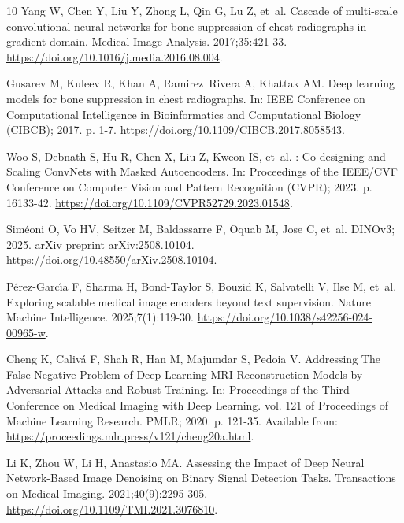 \begin{thebibliography}{10}
Yang W, Chen Y, Liu Y, Zhong L, Qin G, Lu Z, et~al.
\newblock Cascade of multi-scale convolutional neural networks for bone
  suppression of chest radiographs in gradient domain.
\newblock Medical Image Analysis. 2017;35:421-33.
\newblock \url{https://doi.org/10.1016/j.media.2016.08.004}.

Gusarev M, Kuleev R, Khan A, Ramirez~Rivera A, Khattak AM.
\newblock Deep learning models for bone suppression in chest radiographs.
\newblock In: {IEEE} Conference on Computational Intelligence in Bioinformatics
  and Computational Biology ({CIBCB}); 2017. p. 1-7.
\newblock \url{https://doi.org/10.1109/CIBCB.2017.8058543}.

Woo S, Debnath S, Hu R, Chen X, Liu Z, Kweon IS, et~al.
: Co-designing and Scaling {ConvNets} with Masked
  Autoencoders.
\newblock In: Proceedings of the {IEEE/CVF} Conference on Computer Vision and
  Pattern Recognition ({CVPR}); 2023. p. 16133-42.
\newblock \url{https://doi.org/10.1109/CVPR52729.2023.01548}.

Sim{\'e}oni O, Vo HV, Seitzer M, Baldassarre F, Oquab M, Jose C, et~al.
  {DINOv3}; 2025.
\newblock arXiv preprint arXiv:2508.10104.
\newblock \url{https://doi.org/10.48550/arXiv.2508.10104}.

P{\'e}rez-Garc{\'\i}a F, Sharma H, Bond-Taylor S, Bouzid K, Salvatelli V, Ilse
  M, et~al.
\newblock Exploring scalable medical image encoders beyond text supervision.
\newblock Nature Machine Intelligence. 2025;7(1):119-30.
\newblock \url{https://doi.org/10.1038/s42256-024-00965-w}.

Cheng K, Caliv{\'a} F, Shah R, Han M, Majumdar S, Pedoia V.
\newblock Addressing The False Negative Problem of Deep Learning {MRI}
  Reconstruction Models by Adversarial Attacks and Robust Training.
\newblock In: Proceedings of the Third Conference on Medical Imaging with Deep
  Learning. vol. 121 of Proceedings of Machine Learning Research. PMLR; 2020.
  p. 121-35.
\newblock Available from:
  \url{https://proceedings.mlr.press/v121/cheng20a.html}.

Li K, Zhou W, Li H, Anastasio MA.
\newblock Assessing the Impact of Deep Neural Network-Based Image Denoising on
  Binary Signal Detection Tasks.
 Transactions on Medical Imaging. 2021;40(9):2295-305.
\newblock \url{https://doi.org/10.1109/TMI.2021.3076810}.


\end{thebibliography}
